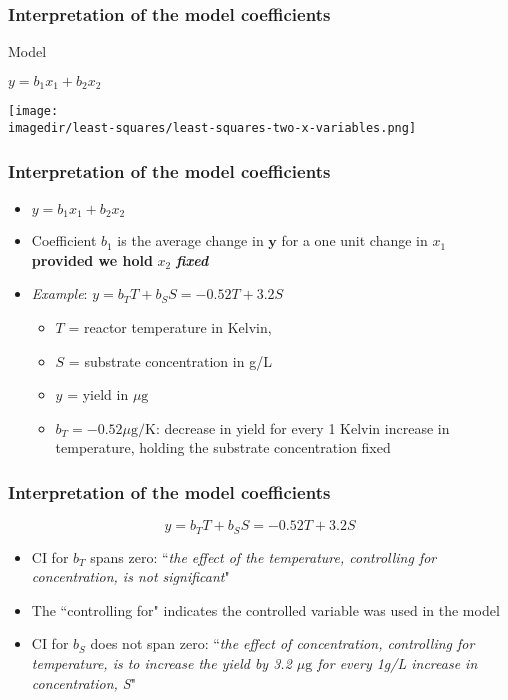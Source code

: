 \begin{frame}\frametitle{Interpretation of the model coefficients}
	\begin{block}{Model}
		\begin{center}
			$y = b_1x_1 + b_2x_2$
		\end{center}
	\end{block}
	\begin{center}
		\texttt{[image: \\imagedir/least-squares/least-squares-two-x-variables.png]}
	\end{center}
\end{frame}

\begin{frame}\frametitle{Interpretation of the model coefficients}
	\begin{itemize}
		\item	$y = b_1x_1 + b_2x_2$
	\end{itemize}
	\begin{itemize}
		\item	Coefficient $b_1$ is the average change in $\mathbf{y}$ for a one unit change in ${x}_1$ \textbf{provided we hold} ${x}_2$ \textbf{\emph{fixed}}
	\end{itemize}
	\begin{itemize}
		\item	\emph{Example}: $y = b_T T + b_S S = -0.52 T + 3.2 S$
		\begin{itemize}
			\item	$T$ = reactor temperature in Kelvin,
			\item	$S$ = substrate concentration in g/L
			\item	$y$ = yield in $\mu\text{g}$
			\item	$b_T = -0.52 \mu\text{g}/\text{K}$: decrease in yield for every 1 Kelvin increase in temperature, holding the substrate concentration fixed
		\end{itemize}
	\end{itemize}
\end{frame}

\begin{frame}\frametitle{Interpretation of the model coefficients}

	$$y = b_T T + b_S S = -0.52 T + 3.2 S$$
	\begin{itemize}
		\item	CI for $b_T$ spans zero: ``\emph{the effect of the temperature, controlling for concentration, is not significant}"
		\item	The ``controlling for" indicates the controlled variable was used in the model
		\item	CI for $b_S$ does not span zero: ``\emph{the effect of concentration, controlling for temperature, is to increase the yield by 3.2 $\mu\text{g}$ for every 1g/L increase in concentration, S}"
	\end{itemize}
\end{frame}

